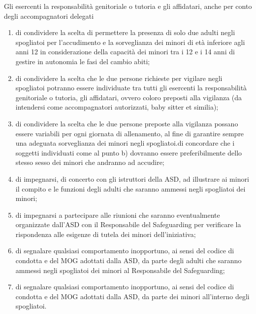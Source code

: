 \documentclass{djtsmod}
\begin{document}
	Gli esercenti la responsabilità genitoriale o tutoria e gli affidatari, anche per conto degli accompagnatori delegati
	\begin{enumerate}[label=\alph*)]
		\item di condividere la scelta di permettere la presenza di solo due adulti negli spogliatoi per l'accudimento e la sorveglianza dei minori di età inferiore agli anni 12 in considerazione della capacità dei minori tra i 12 e i 14 anni di gestire in autonomia le fasi del cambio abiti;
		\item di condividere la scelta che le due persone richieste per vigilare negli spogliatoi potranno essere individuate tra tutti gli esercenti la responsabilità genitoriale o tutoria, gli affidatari, ovvero coloro preposti alla vigilanza (da intendersi come accompagnatori autorizzati, baby sitter et similia); 
		\item di condividere la scelta che le due persone preposte alla vigilanza possano essere variabili per ogni giornata di allenamento, al fine di garantire sempre una adeguata sorveglianza dei minori negli spogliatoi.di concordare che i soggetti individuati come al punto b) dovranno essere preferibilmente dello stesso sesso dei minori che andranno ad accudire;
		\item di impegnarsi, di concerto con gli istruttori della ASD, ad illustrare ai minori il compito e le funzioni degli adulti che saranno ammessi negli spogliatoi dei minori;
		\item di impegnarsi a partecipare alle riunioni che saranno eventualmente organizzate dall'ASD con il Responsabile del Safeguarding per verificare la rispondenza alle esigenze di tutela dei minori dell'iniziativa;
		\item di segnalare qualsiasi comportamento inopportuno, ai sensi del codice di condotta e del MOG adottati dalla ASD, da parte degli adulti che saranno ammessi negli spogliatoi dei minori al Responsabile del Safeguarding;
		\item di segnalare qualsiasi comportamento inopportuno, ai sensi del codice di condotta e del MOG adottati dalla ASD, da parte dei minori all'interno degli spogliatoi.
	\end{enumerate}
	
	
	\newpage
	
\end{document}
